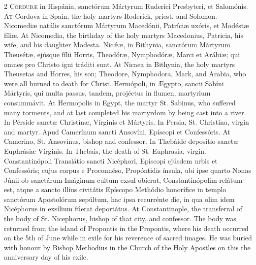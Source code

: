 \begin{paracol}{2}
\lettrine[lines=2]{C}{órdubæ} in Hispánia, sanctórum Mártyrum 
 Ruderíci Presbyteri, et Salomónis.
\switchcolumn
{}
\lettrine[lines=2]{A}{t} Cordova in Spain, the holy martyrs Roderick, priest, and Solomon.
\switchcolumn*
{}
Nicomediæ natális sanctórum Mártyrum Macedónii, 
 Patríciæ uxóris, et Modéstæ fíliæ.
\switchcolumn
{}
At Nicomedia, the birthday of the holy martyrs Macedonius, Patricia, his 
 wife, and his daughter Modesta.
\switchcolumn*
{}
Nicǽæ, in Bithynia, sanctórum Mártyrum Theusétæ, 
 ejúsque fílii Horris, Theodóræ, Nymphodóræ, Marci et Arábiæ; qui omnes pro 
 Christo igni tráditi sunt.
\switchcolumn
{}
At Nicaea in Bithynia, the holy martyrs Theusetas and Horres, his son; 
 Theodore, Nymphodora, Mark, and Arabia, who were all burned to death for 
 Christ.
\switchcolumn*
{}
Hermópoli, in Ægypto, sancti Sabíni Mártyris, 
 qui multa passus, tandem, projéctus in flumen, martyrium consummávit.
\switchcolumn
{}
At Hermopolis in Egypt, the martyr St. Sabinus, who suffered many torments, 
 and at last completed his martyrdom by being cast into a river.
\switchcolumn*
{}
In Pérside sanctæ Christínæ, Vírginis et 
 Mártyris.
\switchcolumn
{}
In Persia, St. Christina, virgin and martyr.
\switchcolumn*
{}
Apud Camerínum sancti Ansovíni, Epíscopi et Confessóris.
\switchcolumn
{}
At Camerino, St. Ansovinus, bishop and confessor.
\switchcolumn*
{}
In Thebáide deposítio sanctæ Euphrásiæ Vírginis.
\switchcolumn
{}
In Thebais, the death of St. Euphrasia, virgin.
\switchcolumn*
{}
Constantinópoli Translátio sancti Nicéphori, 
 Epíscopi ejúsdem urbis et Confessóris; cujus corpus e Proconnéso, 
 Propóntidis ínsula, ubi ipse quarto Nonas Júnii ob sanctárum Imáginum cultum 
 exsul obíerat, Constantinópolim relátum est, atque a sancto illíus civitátis 
 Epíscopo Methódio honorífice in templo sanctórum Apostolórum sepúltum, hac 
 ipsa recurrénte die, in qua olim idem Nicéphorus in exsílium fúerat 
 deportátus.
\switchcolumn
{}
At Constantinople, the transferral of the body of St. Nicephorus, bishop of 
 that city, and confessor. The body was returned from the island of 
 Propontis in the Propontis, where his death occurred on the 5th of June 
 while in exile for his reverence of sacred images. He was buried with 
 honour by Bishop Methodius in the Church of the Holy Apostles on this the 
 anniversary day of his exile.
\switchcolumn*
{}
\end{paracol}


